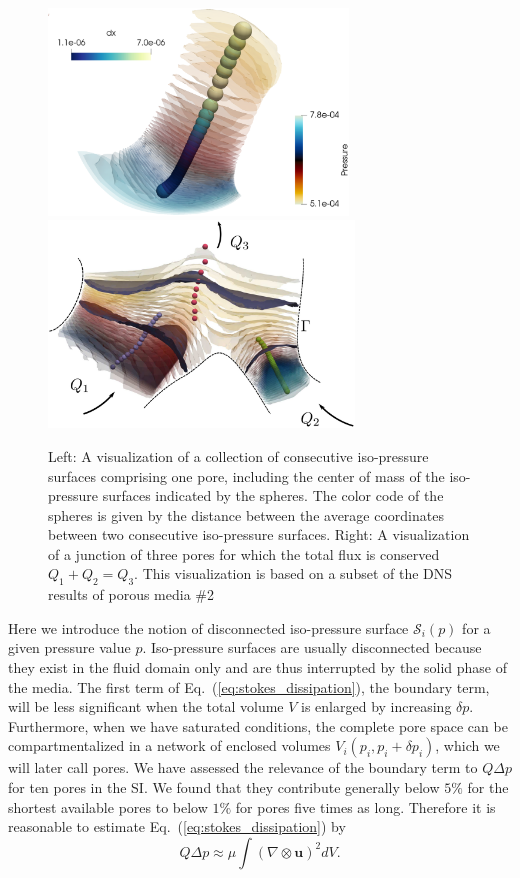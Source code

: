 \documentclass[draft]{agujournal2019}
\begin{document}
\begin{figure}[t!]
\includegraphics[height=5.5cm]{figures/example_pore_v2.eps}
\includegraphics[height=5.5cm]{figures/merging_pores_v2.eps}
\caption{Left: A visualization of a collection of consecutive iso-pressure surfaces comprising one pore, including the center of mass of the iso-pressure surfaces indicated by the spheres. The color code of the spheres is given by the distance between the average coordinates between two consecutive iso-pressure surfaces. Right: A visualization of a junction of three pores for which the total flux is conserved $Q_1+Q_2 = Q_3$. This visualization is based on a subset of the DNS results of porous media \#2}
\label{fig:isop_surfaces}
\end{figure}
Here we introduce the notion of disconnected iso-pressure surface $\mathcal{S}_i(p)$ for a given pressure value $p$. Iso-pressure surfaces are usually disconnected because they exist in the fluid domain only and are thus interrupted by the solid phase of the media. The first term of Eq.~(\ref{eq:stokes_dissipation}), the boundary term, will be less significant when the total volume $V$ is enlarged by increasing $\delta p$. Furthermore, when we have saturated conditions, the complete pore space can be compartmentalized in a network of enclosed volumes $V_i(p_i, p_i+\delta p_i )$, which we will later call pores. We have assessed the relevance of the boundary term to $Q\Delta p$ for ten pores in the SI. We found that they contribute generally below $5\%$ for the shortest available pores to below $1\%$ for pores five times as long. Therefore it is reasonable to estimate Eq.~(\ref{eq:stokes_dissipation}) by
\begin{equation}
Q \Delta p\approx\mu\int (\nabla \otimes \mathbf{u})^2 dV.\label{eq:pore_based_energy_dissipation}
\end{equation}
\end{document}
